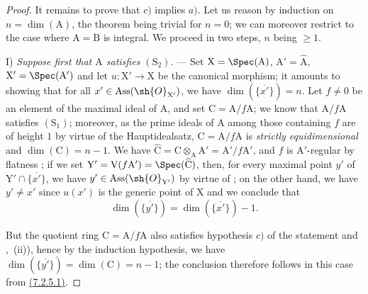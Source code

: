 \begin{proof}

It remains to prove that $c)$ implies $a)$.
Let us reason by induction on $n=\dim(\mathrm{A})$, the theorem being trivial for $n=0$; we can moreover restrict to the case where $\mathrm{A}=\mathrm{B}$ is integral.
We proceed in two steps, $n$ being $\geqslant 1$.

\medskip\noindent
I) \emph{Suppose first that $\mathrm{A}$ satisfies $(\mathrm{S}_2)$.} ---
Set $\mathrm{X}=\Spec(\mathrm{A})$, $\mathrm{A}'=\widehat{\mathrm{A}}$, $\mathrm{X}'=\Spec(\mathrm{A}')$ and let $u:\mathrm{X}'\to\mathrm{X}$ be the canonical morphism; it amounts to showing that for all $x'\in\operatorname{Ass}(\sh{O}_{\mathrm{X}'})$, we have $\dim(\overline{\{x'\}})=n$.
Let $f\neq 0$ be an element of the maximal ideal of $\mathrm{A}$, and set $\mathrm{C}=\mathrm{A}/f\mathrm{A}$; we know  that $\mathrm{A}/f\mathrm{A}$ satisfies $(\mathrm{S}_1)$; moreover, as the prime ideals of $\mathrm{A}$ among those containing $f$ are of height $1$ by virtue of the Hauptidealsatz, $\mathrm{C}=\mathrm{A}/f\mathrm{A}$ is \emph{strictly equidimensional} and $\dim(\mathrm{C})=n-1$.
We have $\widehat{\mathrm{C}}=\mathrm{C}\otimes_\mathrm{A}\mathrm{A}'=\mathrm{A}'/f\mathrm{A}'$, and $f$ is $\mathrm{A}'$-regular by flatness ; if we set $\mathrm{Y}'=\mathrm{V}(f\mathrm{A}')=\Spec(\widehat{\mathrm{C}})$, then, for every maximal point $y'$ of $\mathrm{Y}'\cap\overline{\{x'\}}$, we have $y'\in\operatorname{Ass}(\sh{O}_{\mathrm{Y}'})$ by virtue of ; on the other hand, we have $y'\neq x'$ since $u(x')$ is the generic point of $\mathrm{X}$  and we conclude  that
\[
  \dim(\overline{\{y'\}})=\dim(\overline{\{x'\}})-1.
  \tag{7.2.5.1}
\label{IV.7.2.5.1}
\]

But the quotient ring $\mathrm{C}=\mathrm{A}/f\mathrm{A}$ also satisfies hypothesis $c)$ of the statement  and ,~(ii)), hence by the induction hypothesis, we have $\dim(\overline{\{y'\}})=\dim(\mathrm{C})=n-1$; the conclusion therefore follows in this case from {\hyperlink{ega4.c04.eq.7-2-5-1}{(7.2.5.1)}}.


\end{proof}

